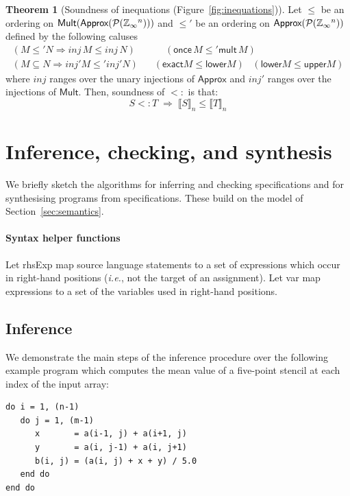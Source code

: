 \documentclass[9pt]{sigplanconf}
\newcounter{block}
\theoremstyle{definition}
\newtheorem{theorem}[block]{Theorem}
\newcommand{\ie}{\emph{i.e.}}
\newcommand{\interp}[1]{\llbracket{#1}\rrbracket}
\newcommand{\rhsExp}{\textsf{rhsExp}}
\newcommand{\var}{\textsf{var}}
\begin{document}
\begin{theorem}[Soundness of inequations
  (Figure~\ref{fig:inequations})] 

Let $\leq$ be an ordering on
$\textsf{Mult}(\textsf{Approx}(\mathcal{P}(\mathbb{Z}_\infty{}^n)))$
and $\leq'$ be an ordering on
$\textsf{Approx}(\mathcal{P}(\mathbb{Z}_\infty{}^n))$ defined by the
following caluses
\begin{align*}
(M \leq' N \Rightarrow \textit{inj} \, M \leq \textit{inj} \, N) &
\qquad 
(\textsf{once} \, M \leq' \textsf{mult} \, M) \\
(M \subseteq N \Rightarrow \textit{inj}' M \leq' \textit{inj}' N)
& \;\;\; (\textsf{exact} M \leq  \textsf{lower} M)
\;\;\; (\textsf{lower} M \leq  \textsf{upper} M)
\end{align*}
where $\textit{inj}$ ranges over the unary injections
of $\textsf{Approx}$ and $\textit{inj}'$ ranges over the injections of
$\textsf{Mult}$. Then, soundness of $<:$ is that:
\[
S <: T
\; \Rightarrow \;
\interp{S}_n \leq \interp{T}_n
\]
\end{theorem}

\section{Inference, checking, and synthesis}
\label{sec:analysis}

\noindent
We briefly sketch the algorithms for inferring and checking
specifications and for synthesising programs from specifications.
These build on the model of Section~\ref{sec:semantics}.

\paragraph{Syntax helper functions}
Let \rhsExp{} map source language statements to a
set of expressions which occur in right-hand positions (\ie{}, not the
target of an assignment). Let \var{} map expressions to a
set of the variables used in right-hand positions.

\subsection{Inference\label{subsec:inference}}

We demonstrate the main steps of the inference procedure over the
following example program which computes the mean value
of a five-point stencil at each index of the input array:
\begin{verbatim}
do i = 1, (n-1)
   do j = 1, (m-1)
      x       = a(i-1, j) + a(i+1, j)
      y       = a(i, j-1) + a(i, j+1)
      b(i, j) = (a(i, j) + x + y) / 5.0
   end do
end do
\end{verbatim}
\end{document}
